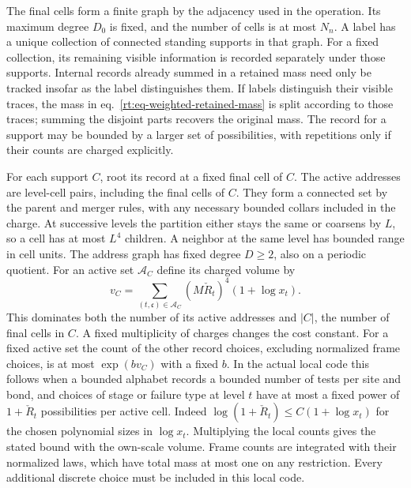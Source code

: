 \documentclass[11pt,letterpaper,reqno]{amsart}
\numberwithin{equation}{section}
\renewcommand{\eqref}[1]{\textup{eq.~\ref{#1}}}
\theoremstyle{definition}
\theoremstyle{remark}
\begin{document}
The final cells form a finite graph by the adjacency used in
the operation. Its maximum degree \(D_0\) is fixed, and the
number of cells is at most \(N_n\). A label has a unique
collection of connected standing supports in that graph.
For a fixed collection, its remaining visible information is
recorded separately under those supports. Internal records
already summed in a retained mass need only be tracked insofar
as the label distinguishes them. If labels distinguish their
visible traces, the mass in \eqref{rt:eq-weighted-retained-mass}
is split according to those traces; summing the disjoint parts
recovers the original mass. The record for a support may be
bounded by a larger set of possibilities, with repetitions only
if their counts are charged explicitly.

For each support \(C\), root its record at a fixed final cell
of \(C\). The active addresses are level-cell pairs, including
the final cells of \(C\). They form a connected set by the
parent and merger rules, with any necessary bounded collars
included in the charge. At successive levels the partition
either stays the same or coarsens by \(L\), so a cell has at
most \(L^4\) children. A neighbor at the same level has bounded
range in cell units. The address graph has fixed degree
\(D\ge2\), also on a periodic quotient. For an active set
\(\mathcal A_C\) define its charged volume by
\[
 v_C=\sum_{(t,\mathfrak c)\in\mathcal A_C}
       (M\check R_t)^4(1+\log x_t).
\]
This dominates both the number of its active addresses and
\(|C|\), the number of final cells in \(C\). A fixed
multiplicity of charges changes the cost constant. For a
fixed active set the count of the other
record choices, excluding normalized frame choices, is at
most \(\exp(bv_C)\) with a fixed \(b\). In the actual local
code this follows when a bounded alphabet records a bounded
number of tests per site and bond, and choices of stage or
failure type at level \(t\) have at most a fixed power of
\(1+\check R_t\) possibilities per active cell.
Indeed \(\log(1+\check R_t)\le C(1+\log x_t)\) for the
chosen polynomial sizes in \(\log x_t\). Multiplying the
local counts gives the stated bound with the own-scale volume.
Frame counts are integrated with their normalized laws, which
have total mass at most one on any restriction. Every
additional discrete choice must be included in this local code.
\end{document}
